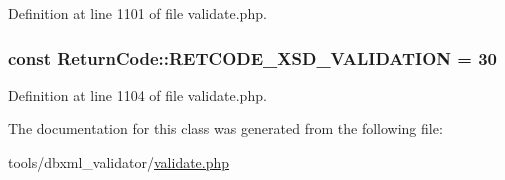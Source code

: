 Definition at line 1101 of file validate.\+php.

\hypertarget{classReturnCode_a93db5420236cb54ab9743b3147ae6eea}{
\subsubsection[{R\+E\+T\+C\+O\+D\+E\+\_\+\+X\+S\+D\+\_\+\+V\+A\+L\+I\+D\+A\+T\+I\+O\+N}]{\setlength{\rightskip}{0pt plus 5cm}const Return\+Code\+::\+R\+E\+T\+C\+O\+D\+E\+\_\+\+X\+S\+D\+\_\+\+V\+A\+L\+I\+D\+A\+T\+I\+O\+N = 30}}\label{classReturnCode_a93db5420236cb54ab9743b3147ae6eea}


Definition at line 1104 of file validate.\+php.



The documentation for this class was generated from the following file\+:\begin{DoxyCompactItemize}
\item 
tools/dbxml\+\_\+validator/\hyperlink{validate_8php}{validate.\+php}\end{DoxyCompactItemize}
